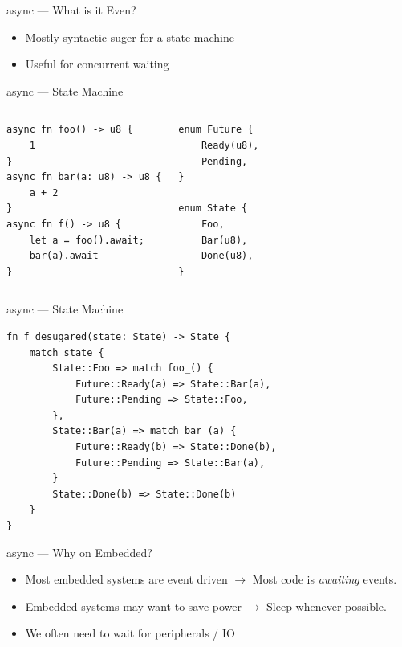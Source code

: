 \documentclass[aspectratio=1610,14pt,t]{beamer}
\begin{document}
\begin{frame}[c]{async --- What is it Even?}
  \begin{itemize}
    \item Mostly syntactic suger for a state machine
    \item Useful for concurrent waiting
  \end{itemize}
\end{frame}

\begin{frame}[c,fragile]{async --- State Machine}
  \begin{columns}[t,onlytextwidth]
  \begin{verbatim}
async fn foo() -> u8 {
    1
}
async fn bar(a: u8) -> u8 {
    a + 2
}
async fn f() -> u8 {
    let a = foo().await;
    bar(a).await
}
	\end{verbatim}
  \pause{}
  \begin{verbatim}
enum Future {
    Ready(u8),
    Pending,
}

enum State {
    Foo,
    Bar(u8),
    Done(u8),
}
  \end{verbatim}
	\end{columns}
\end{frame}

\begin{frame}[c,fragile]{async --- State Machine}
  \begin{verbatim}
fn f_desugared(state: State) -> State {
    match state {
        State::Foo => match foo_() {
            Future::Ready(a) => State::Bar(a),
            Future::Pending => State::Foo,
        },
        State::Bar(a) => match bar_(a) {
            Future::Ready(b) => State::Done(b),
            Future::Pending => State::Bar(a),
        }
        State::Done(b) => State::Done(b)
    }
}
  \end{verbatim}
\end{frame}

\begin{frame}[c]{async --- Why on Embedded?}
  \begin{itemize}
    \item Most embedded systems are event driven $\rightarrow$ Most code is
      \emph{awaiting} events.
    \item Embedded systems may want to save power $\rightarrow$ Sleep whenever
      possible.
		\item We often need to wait for peripherals / IO
  \end{itemize}
\end{frame}
\end{document}
